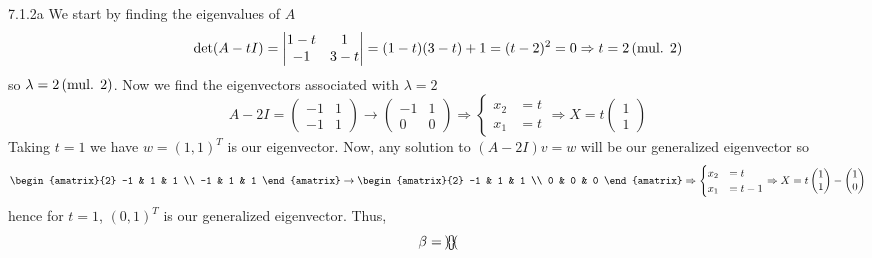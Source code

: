 \documentclass{exam}
\begin{document}
  \begin{problem}{7.1.2a}
    We start by finding the eigenvalues of $A$ 
    \[
      \det(A - tI) = \begin{vmatrix}
        1 - t & 1 \\
        -1 & 3 - t
      \end{vmatrix}
      = (1 - t)(3 - t) + 1 = (t - 2)^2 = 0 \Rightarrow t = 2 \,(\text{mul. } 2)
    \]
    so $\lambda = 2 \,(\text{mul. } 2)$. Now we find the eigenvectors associated with $\lambda = 2$ 
    \[
      A - 2I = \begin{pmatrix}
        -1 & 1 \\
        -1 & 1
      \end{pmatrix}
      \to \begin{pmatrix}
        -1 & 1 \\
        0 & 0
      \end{pmatrix}
      \Rightarrow \begin{cases}
        x_2 &= t \\
        x_1 &= t
      \end{cases}
      \Rightarrow X = t\begin{pmatrix}
        1 \\ 1
      \end{pmatrix}
    \]
    Taking $t = 1$ we have $w = (1, 1)^{T}$ is our eigenvector. Now, any solution to $(A - 2I)v = w$ will be our generalized eigenvector so  
    \[
      \begin{amatrix}{2}
        -1 & 1 & 1 \\
        -1 & 1 & 1
      \end{amatrix}
      \to \begin{amatrix}{2}
        -1 & 1 & 1 \\
        0 & 0 & 0 
      \end{amatrix}
      \Rightarrow \begin{cases}
        x_2 &= t \\
        x_1 &= t - 1
      \end{cases}
      \Rightarrow X = t\begin{pmatrix}
        1 \\ 1
      \end{pmatrix}
      - \begin{pmatrix}
        1 \\ 0
      \end{pmatrix}
    \]
    hence for $t = 1$, $(0, 1)^{T}$ is our generalized eigenvector. Thus, 
    \[
      \beta = \left\{
        \begin{pmatrix}

\end{pmatrix} \right\}\]
\end{problem}
\end{document}

